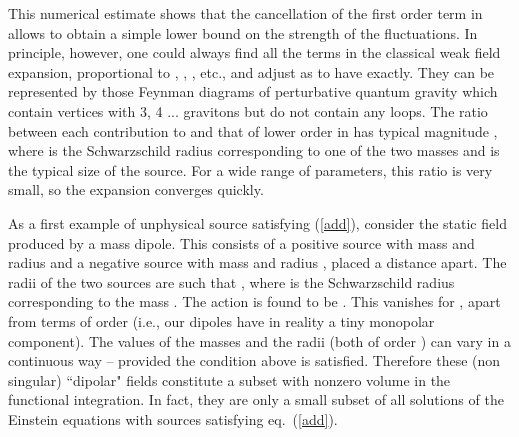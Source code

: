 \documentclass[a4paper,11pt]{article}
\begin{document}
This numerical estimate shows that the cancellation of the first 
order term in \coordHE{} allows to obtain a simple
lower bound on the strength of the fluctuations.
In principle, however, one could always find all the terms
in the classical weak field expansion, proportional to
\coordHE{}, \coordHE{}, \coordHE{}, etc., and adjust \coordHE{} as to have 
\coordHE{} exactly. They can be represented by
those Feynman diagrams of perturbative quantum gravity
which contain vertices with 3, 4 ... gravitons but do not 
contain any loops. 
The ratio between each contribution to \coordHE{} and that of
lower order in \coordHE{} has typical magnitude
\coordHE{},
where \coordHE{} is the Schwarzschild radius
corresponding to one of the two masses and \coordHE{}       
is the typical size of the source. For a wide range of
parameters, this ratio is very small, so the expansion
converges quickly. 

As a first example of unphysical source satisfying 
(\ref{add}), consider the static field produced 
by a mass dipole. This consists of a positive source 
with mass 
\coordHE{} and radius \coordHE{} and a negative source with 
mass \coordHE{} and radius \coordHE{}, placed a distance 
\coordHE{} apart. The radii of the 
two sources are such that \coordHE{}, 
where \coordHE{} is the Schwarzschild radius corresponding 
to the mass \coordHE{}. 
The action is found to be
\coordHE{}.
This vanishes for \coordHE{},
apart from terms of order \coordHE{} (i.e., our dipoles have 
in reality a tiny monopolar component). The values of 
the masses and the radii \coordHE{} (both of order \coordHE{}) can 
vary in a continuous way -- provided the condition above
is satisfied. Therefore these (non singular) ``dipolar" 
fields constitute a subset with nonzero volume 
in the functional integration. In fact, they are only 
a small subset of all solutions of the Einstein equations
with sources satisfying eq.\ (\ref{add}).
\end{document}
